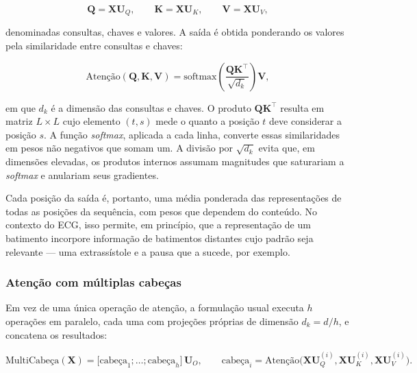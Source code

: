 \begin{equation}
	\mathbf{Q} = \mathbf{X}\mathbf{U}_Q, \qquad
	\mathbf{K} = \mathbf{X}\mathbf{U}_K, \qquad
	\mathbf{V} = \mathbf{X}\mathbf{U}_V,
	\label{eq:qkv}
\end{equation}

\noindent
denominadas consultas, chaves e valores. A saída é obtida ponderando os
valores pela similaridade entre consultas e chaves:

\begin{equation}
	\mathrm{Atenção}(\mathbf{Q}, \mathbf{K}, \mathbf{V}) =
	\mathrm{softmax}\!\left(\frac{\mathbf{Q}\mathbf{K}^{\top}}{\sqrt{d_k}}\right)
	\mathbf{V},
	\label{eq:atencao}
\end{equation}

\noindent
em que $d_k$ é a dimensão das consultas e chaves. O produto
$\mathbf{Q}\mathbf{K}^{\top}$ resulta em matriz $L \times L$ cujo elemento
$(t, s)$ mede o quanto a posição $t$ deve considerar a posição $s$. A função
\textit{softmax}, aplicada a cada linha, converte essas similaridades em
pesos não negativos que somam um. A divisão por $\sqrt{d_k}$ evita que, em
dimensões elevadas, os produtos internos assumam magnitudes que saturariam a
\textit{softmax} e anulariam seus gradientes.

Cada posição da saída é, portanto, uma média ponderada das representações
de todas as posições da sequência, com pesos que dependem do conteúdo. No
contexto do \gls{ECG}, isso permite, em princípio, que a representação de um
batimento incorpore informação de batimentos distantes cujo padrão seja
relevante --- uma extrassístole e a pausa que a sucede, por exemplo.

\subsubsection{Atenção com múltiplas cabeças}
\label{subsubsec:fund-multicabeca}

Em vez de uma única operação de atenção, a formulação usual executa $h$
operações em paralelo, cada uma com projeções próprias de dimensão
$d_k = d/h$, e concatena os resultados:

\begin{equation}
	\mathrm{MultiCabeça}(\mathbf{X}) =
	\big[\mathrm{cabeça}_1; \ldots; \mathrm{cabeça}_h\big]\,\mathbf{U}_O,
	\qquad
	\mathrm{cabeça}_i = \mathrm{Atenção}\big(\mathbf{X}\mathbf{U}_Q^{(i)},
	\mathbf{X}\mathbf{U}_K^{(i)}, \mathbf{X}\mathbf{U}_V^{(i)}\big).
	\label{eq:multicabeca}
\end{equation}

